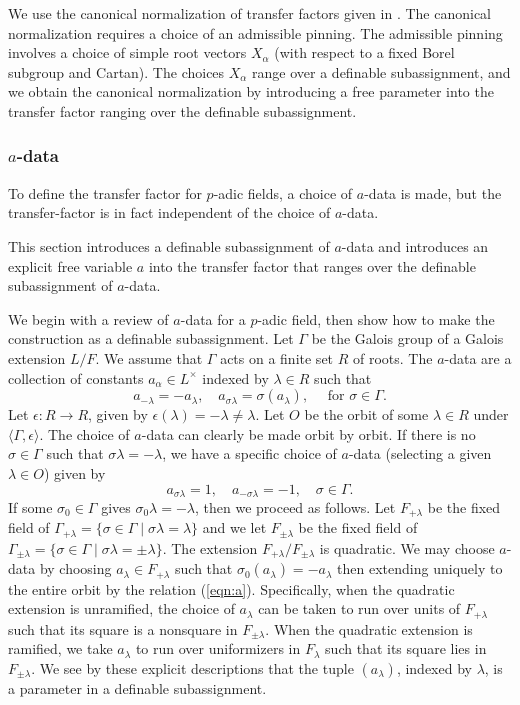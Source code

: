 We use the canonical normalization of transfer factors given in
\cite[\S7]{hales1993simple}.  The canonical normalization requires a
choice of an admissible pinning.  The admissible pinning involves a
choice of simple root vectors $X_\alpha$ (with respect to a fixed
Borel subgroup and Cartan).  The choices $X_\alpha$ range over a
definable subassignment, and we obtain the canonical normalization by
introducing a free parameter into the transfer factor ranging over the
definable subassignment.

\subsubsection{$a$-data}

To define the transfer factor for $p$-adic fields, a choice of
$a$-data is made, but the transfer-factor is in fact independent of
the choice of $a$-data.

This section introduces a definable subassignment of $a$-data and
introduces an explicit free variable $a$ into the transfer factor that
ranges over the definable subassignment of $a$-data.  

We begin with a review of $a$-data for a $p$-adic field, then show how
to make the construction as a definable subassignment.  Let $\Gamma$
be the Galois group of a Galois extension $L/F$.  We assume that
$\Gamma$ acts on a finite set $R$ of roots.  The $a$-data are a
collection of constants $a_\alpha\in L^\times$ indexed by $\lambda\in
R$ such that
\begin{equation}\label{eqn:a}
a_{-\lambda} = -a_\lambda,\quad a_{\sigma\lambda} 
= \sigma(a_\lambda),\quad \text{ for } \sigma\in \Gamma.
\end{equation}
Let $\epsilon:R\to R$, given by
$\epsilon(\lambda)=-\lambda\ne\lambda$.  Let $O$ be the orbit of some
$\lambda\in R$ under $\langle\Gamma,\epsilon\rangle$.  The choice of
$a$-data can clearly be made orbit by orbit.  If there is no
$\sigma\in \Gamma$ such that $\sigma\lambda=-\lambda$, we have a
specific choice of $a$-data (selecting a given $\lambda\in O$) given
by
\[
a_{\sigma\lambda}=1,
\quad a_{-\sigma\lambda}=-1,\quad \sigma\in\Gamma.
\]
If some $\sigma_0\in\Gamma$ gives $\sigma_0\lambda=-\lambda$, then we
proceed as follows. Let $F_{+\lambda}$ be the fixed field of
$\Gamma_{+\lambda} = \{\sigma\in\Gamma\mid \sigma\lambda=\lambda\}$
and we let $F_{\pm\lambda}$ be the fixed field of $\Gamma_{\pm\lambda}
= \{\sigma\in\Gamma\mid \sigma\lambda=\pm\lambda\}$.  The extension
$F_{+\lambda}/F_{\pm\lambda}$ is quadratic.  We may choose $a$-data by
choosing $a_\lambda\in F_{+\lambda}$ such that $\sigma_0(a_\lambda) =
-a_\lambda$ then extending uniquely to the entire orbit by the
relation (\ref{eqn:a}).  Specifically, when the quadratic extension is
unramified, the choice of $a_\lambda$ can be taken to run over units
of $F_{+\lambda}$ such that its square is a nonsquare in
$F_{\pm\lambda}$.  When the quadratic extension is ramified, we take
$a_\lambda$ to run over uniformizers in $F_{\lambda}$ such that its
square lies in $F_{\pm\lambda}$.  We see by these explicit
descriptions that the tuple $(a_\lambda)$, indexed by $\lambda$, is a
parameter in a definable subassignment.

